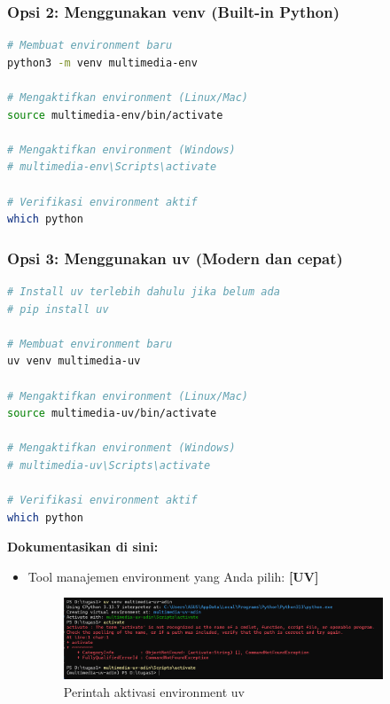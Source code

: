 \documentclass[11pt,a4paper]{article}
\begin{document}
\subsubsection{Opsi 2: Menggunakan venv (Built-in Python)}
\begin{lstlisting}[language=bash, caption=Membuat environment dengan venv]
# Membuat environment baru
python3 -m venv multimedia-env

# Mengaktifkan environment (Linux/Mac)
source multimedia-env/bin/activate

# Mengaktifkan environment (Windows)
# multimedia-env\Scripts\activate

# Verifikasi environment aktif
which python
\end{lstlisting}

\subsubsection{Opsi 3: Menggunakan uv (Modern dan cepat)}
\begin{lstlisting}[language=bash, caption=Membuat environment dengan uv]
# Install uv terlebih dahulu jika belum ada
# pip install uv

# Membuat environment baru
uv venv multimedia-uv

# Mengaktifkan environment (Linux/Mac)
source multimedia-uv/bin/activate

# Mengaktifkan environment (Windows)
# multimedia-uv\Scripts\activate

# Verifikasi environment aktif
which python
\end{lstlisting}

\textbf{Dokumentasikan di sini:}
\begin{itemize}
    \item Tool manajemen environment yang Anda pilih: \textbf{[UV]}
    \begin{figure}[H]
        \centering
        \includegraphics[width=0.9\textwidth]{image/image1.png}
        \caption{Perintah aktivasi environment uv}
        \label{fig:audio-dl}
    \end{figure}
\end{itemize}
\end{document}
